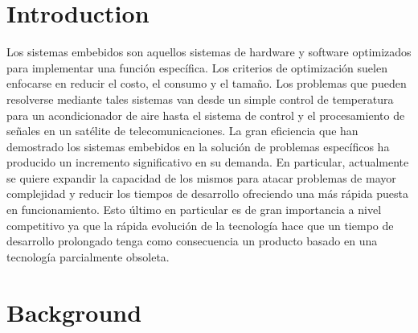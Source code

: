 \documentclass[conference]{IEEEtran}
\begin{document}




%
\IEEEpeerreviewmaketitle



\section{Introduction} \label{sec:intro}

Los sistemas embebidos son aquellos sistemas de hardware y software optimizados para
implementar una función específica. Los criterios de optimización
suelen enfocarse en reducir el costo, el consumo y el tamaño. Los
problemas que pueden resolverse mediante tales sistemas van desde un
simple control de temperatura para un acondicionador de aire hasta el
sistema de control y el procesamiento de señales en un satélite de
telecomunicaciones. La gran eficiencia que han demostrado los sistemas
embebidos en la solución de problemas específicos ha producido un
incremento significativo en su demanda. En particular, actualmente se
quiere expandir la capacidad de los mismos para atacar problemas de
mayor complejidad y reducir los tiempos de desarrollo ofreciendo una
más rápida puesta en funcionamiento. Esto último en particular es de
gran importancia a nivel competitivo ya que la rápida evolución de la
tecnología hace que un tiempo de desarrollo prolongado tenga como
consecuencia un producto basado en una tecnología parcialmente
obsoleta.

\section{Background} \label{sec:background}
\end{document}
